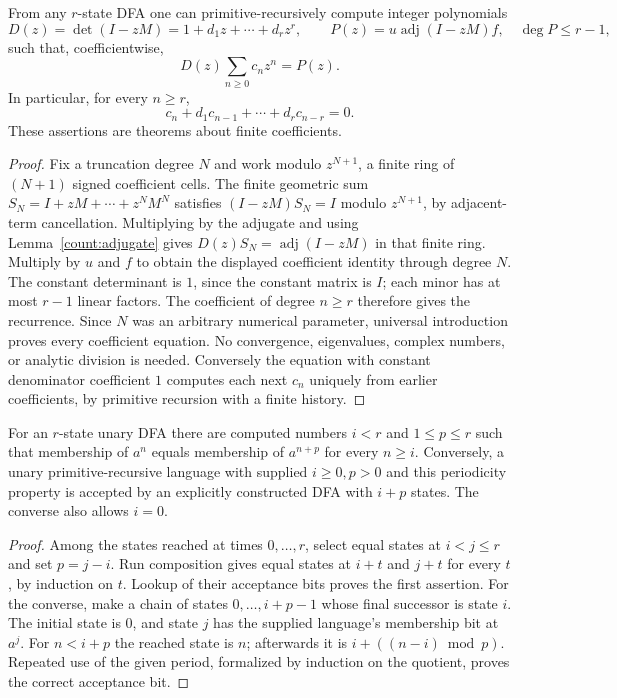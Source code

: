 \begin{theorem}
\label{count:rational}
From any $r$-state DFA one can primitive-recursively compute integer
polynomials
\[
 D(z)=\det(I-zM)=1+d_1z+\cdots+d_rz^r,\qquad
 P(z)=u\operatorname{adj}(I-zM)f,\quad\deg P\le r-1,
\]
such that, coefficientwise,
\[
 D(z)\sum_{n\ge0}c_nz^n=P(z).
\]
In particular, for every $n\ge r$,
\[
 c_n+d_1c_{n-1}+\cdots+d_rc_{n-r}=0.
\]
These assertions are \ipra{} theorems about finite coefficients.
\end{theorem}
\begin{proof}
Fix a truncation degree $N$ and work modulo $z^{N+1}$, a finite ring of
$(N+1)$ signed coefficient cells. The finite geometric sum
$S_N=I+zM+\cdots+z^NM^N$ satisfies
$(I-zM)S_N=I$ modulo $z^{N+1}$, by adjacent-term cancellation.
Multiplying by the adjugate and using Lemma~\ref{count:adjugate} gives
$D(z)S_N=\operatorname{adj}(I-zM)$ in that finite ring.
Multiply by $u$ and $f$ to obtain the displayed coefficient identity
through degree $N$. The constant determinant is $1$, since the constant
matrix is $I$; each minor has at most $r-1$ linear factors. The coefficient
of degree $n\ge r$ therefore gives the recurrence. Since $N$ was an
arbitrary numerical parameter, universal introduction proves every
coefficient equation. No convergence, eigenvalues, complex numbers,
or analytic division is needed. Conversely the equation with constant
denominator coefficient $1$ computes each next $c_n$ uniquely from
earlier coefficients, by primitive recursion with a finite history.
\end{proof}

\begin{theorem}
\label{count:unary}
For an $r$-state unary DFA there are computed numbers $i<r$ and
$1\le p\le r$ such that membership of $a^n$ equals membership of
$a^{n+p}$ for every $n\ge i$. Conversely, a unary primitive-recursive
language with supplied $i\ge0,p>0$ and this periodicity property is accepted
by an explicitly constructed DFA with $i+p$ states. The converse also
allows $i=0$.
\end{theorem}
\begin{proof}
Among the states reached at times $0,\ldots,r$, select equal states at
$i<j\le r$ and set $p=j-i$. Run composition gives equal states at
$i+t$ and $j+t$ for every $t$, by induction on $t$. Lookup of their
acceptance bits proves the first assertion. For the converse, make a
chain of states $0,\ldots,i+p-1$ whose final successor is state $i$.
The initial state is $0$, and state $j$ has the supplied language's
membership bit at $a^j$. For $n<i+p$ the reached state is $n$; afterwards
it is $i+((n-i)\bmod p)$. Repeated use of the given period, formalized
by induction on the quotient, proves the correct acceptance bit.
\end{proof}

